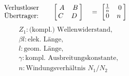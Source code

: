 \begin{itemize}
\begin{align*}
            &\parbox{2.5cm}{Verlustloser Übertrager:}
            \begin{bmatrix}\
                A & B\\
                C & D\
            \end{bmatrix}\
            &=\
            \begin{bmatrix}
                \frac{1}{n} & 0\\
                0 & n\
            \end{bmatrix}
        \end{align*}
        \begin{align*}
            &Z_1: \text{(kompl.) Wellenwiderstand,}\\
            &\beta l: \text{elek. Länge,}\\
            &l: \text{geom. Länge,}\\
            &\gamma: \text{kompl. Ausbreitungskonstante,}\\
            &n: \text{Windungsverhältnis } N_1/N_2
        \end{align*}
\end{itemize}


